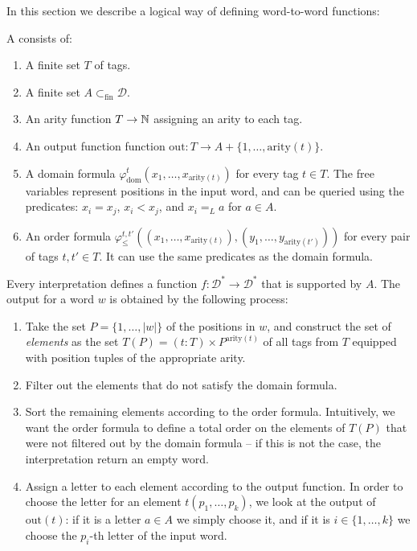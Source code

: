 \AP
In this section we describe a logical way of defining word-to-word functions: 
\begin{definition}
A  consists of:
\begin{enumerate}
\item A finite set $T$ of tags.
\item A finite set $A \subset_{\textrm{fin}}\mathcal{D}$.
\item An arity function $T \to \mathbb{N}$ assigning an arity to each tag.
\item An output function function $\text{out} : T \to A + \{1, \ldots, \text{arity}(t)\}$. 
\item A domain formula $\varphi_{\text{dom}}^t(x_1,\ldots,x_{\text{arity}(t)})$ for every tag $t \in T$.
      The free variables represent positions in the input word, and can be queried using the predicates: 
      $x_i = x_j$, $x_i < x_j$, and $x_i =_L a$ for $a \in A$.
\item An order formula $\varphi_{\leq}^{t,t'}((x_1,\ldots,x_{\text{arity}(t)}),(y_1,\ldots,y_{\text{arity}(t')}))$ for every pair of tags $t,t' \in T$. 
      It can use the same predicates as the domain formula. 
\end{enumerate}
\end{definition}

Every interpretation defines a function $f : \mathcal{D}^* \to \mathcal{D}^*$ that is supported by $A$.
The output for a word $w$ is obtained by the following process:
\begin{enumerate}
    \item  Take the set $P = \{1, \ldots, |w|\}$ of the positions in $w$, and construct the set 
           of \emph{elements} as the set $T(P) = (t : T) \times P^{\text{arity}(t)}$
           of all tags from $T$ equipped with position tuples of the appropriate arity.
    \item Filter out the elements that do not satisfy the domain formula.
    \item Sort the remaining elements according to the order formula. Intuitively, we 
          want the order formula to define a total order on the elements of $T(P)$ that 
          were not filtered out by the domain formula -- if this is not the case,
          the interpretation return an empty word.
    \item Assign a letter to each element according to the output function.
          In order to choose the letter for an element $t(p_1, \ldots, p_k)$, we look at the 
          output of $\text{out}(t)$: if it is a letter $a \in A$ we simply choose it,
          and if it is $i \in \{1, \ldots, k\}$ we choose the $p_i$-th letter of the input word.
\end{enumerate}

